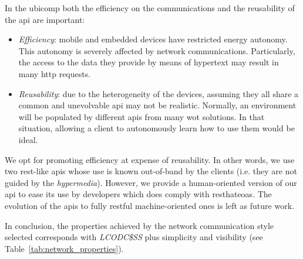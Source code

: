 


In the \ac{ubicomp} both the efficiency on the communications and the reusability of the \ac{api} are important:
\begin{itemize}
  \item \emph{Efficiency}: mobile and embedded devices have restricted energy autonomy.
                    This autonomy is severely affected by network communications. %
                    Particularly, the access to the data they provide by means of hypertext may result in many \ac{http} requests. %
  \item \emph{Reusability}: due to the heterogeneity of the devices, assuming they all share a common and unevolvable \ac{api} may not be realistic.
			    Normally, an environment will be populated by different \acp{api} from many \ac{wot} solutions.
			    In that situation, allowing a client to autonomously learn how to use them would be ideal.
\end{itemize}


We opt for promoting efficiency at expense of reusability.
In other words, we use two \ac{rest}-like \acp{api} whose use is known out-of-band by the clients (i.e. they are not guided by the \emph{hypermedia}). %
However, we provide a human-oriented version of our \ac{api} to ease its use by developers which does comply with \ac{resthateoas}.%
The evolution of the \acp{api} to fully \ac{rest}ful machine-oriented ones is left as future work. %

\bigskip

In conclusion, the properties achieved by the network communication style selected corresponds with \emph{LCODC\$SS} plus simplicity and visibility (see Table~\ref{tab:network_properties}). %

